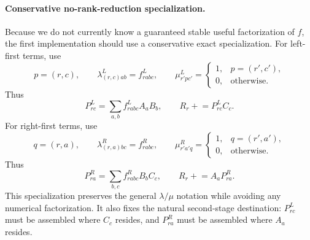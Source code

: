 \documentclass[11pt]{article}
\begin{document}
\paragraph{Conservative no-rank-reduction specialization.}
Because we do not currently know a guaranteed stable useful factorization of
$f$, the first implementation should use a conservative exact specialization.
For left-first terms, use
\begin{equation}
  p=(r,c), \qquad
  \lambda^L_{(r,c)ab} = f^L_{rabc}, \qquad
  \mu^L_{r'p c'} =
    \begin{cases}
      1, & p=(r',c'),\\
      0, & \text{otherwise}.
    \end{cases}
\end{equation}
Thus
\begin{equation}
  P^L_{rc} = \sum_{a,b} f^L_{rabc} A_aB_b,
  \qquad
  R_r \mathrel{+}= P^L_{rc}C_c.
\end{equation}
For right-first terms, use
\begin{equation}
  q=(r,a), \qquad
  \lambda^R_{(r,a)bc} = f^R_{rabc}, \qquad
  \mu^R_{r'a'q} =
    \begin{cases}
      1, & q=(r',a'),\\
      0, & \text{otherwise}.
    \end{cases}
\end{equation}
Thus
\begin{equation}
  P^R_{ra} = \sum_{b,c} f^R_{rabc} B_bC_c,
  \qquad
  R_r \mathrel{+}= A_aP^R_{ra}.
\end{equation}
This specialization preserves the general $\lambda/\mu$ notation while avoiding
any numerical factorization.  It also fixes the natural second-stage
destination: $P^L_{rc}$ must be assembled where $C_c$ resides, and $P^R_{ra}$
must be assembled where $A_a$ resides.
\end{document}
